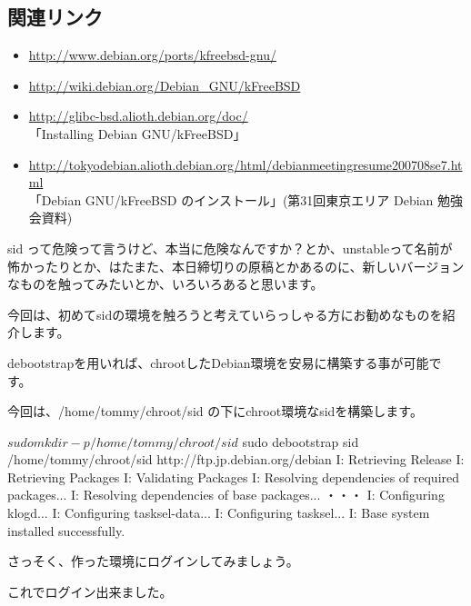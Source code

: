\documentclass[mingoth,a4paper]{jsarticle}
\begin{document}
\subsection{関連リンク}

\begin{itemize}
\item \url{http://www.debian.org/ports/kfreebsd-gnu/}
\item \url{http://wiki.debian.org/Debian_GNU/kFreeBSD}
\item \url{http://glibc-bsd.alioth.debian.org/doc/} \\
  「Installing Debian GNU/kFreeBSD」
\item \url{http://tokyodebian.alioth.debian.org/html/debianmeetingresume200708se7.html} \\
  「Debian GNU/kFreeBSD のインストール」(第31回東京エリア Debian 勉強会資料)
\end{itemize}


sid って危険って言うけど、本当に危険なんですか？とか、unstableって名前が
怖かったりとか、はたまた、本日締切りの原稿とかあるのに、新しいバージョン
なものを触ってみたいとか、いろいろあると思います。

今回は、初めてsidの環境を触ろうと考えていらっしゃる方にお勧めなものを紹介します。

debootstrapを用いれば、chrootしたDebian環境を安易に構築する事が可能です。

今回は、/home/tommy/chroot/sid の下にchroot環境なsidを構築します。

\begin{commandline}
 $ sudo mkdir -p /home/tommy/chroot/sid
 $ sudo debootstrap sid /home/tommy/chroot/sid http://ftp.jp.debian.org/debian
I: Retrieving Release
I: Retrieving Packages
I: Validating Packages
I: Resolving dependencies of required packages...
I: Resolving dependencies of base packages...
・・・
I: Configuring klogd...
I: Configuring tasksel-data...
I: Configuring tasksel...
I: Base system installed successfully.
\end{commandline}

さっそく、作った環境にログインしてみましょう。


これでログイン出来ました。
\end{document}
